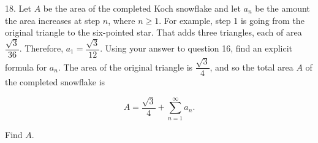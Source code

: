 \documentclass{article}
\begin{document}
18. Let $A$ be the area of the completed Koch snowflake and let $a_n$ be the amount the area increases at step $n$, where $n \geq 1$. For example, step 1 is going from the original triangle to the six-pointed star. That adds three triangles, each of area $\dfrac{\sqrt{3}}{36}$. Therefore, $a_1 = \dfrac{\sqrt{3}}{12}$. Using your answer to question 16, find an explicit formula for $a_n$. The area of the original triangle is $\dfrac{\sqrt{3}}{4}$, and so the total area $A$ of the completed snowflake is 

$$
	A = \frac{\sqrt{3}}{4} + \sum_{n = 1}^\infty a_n.
$$

Find $A$.
\end{document}
